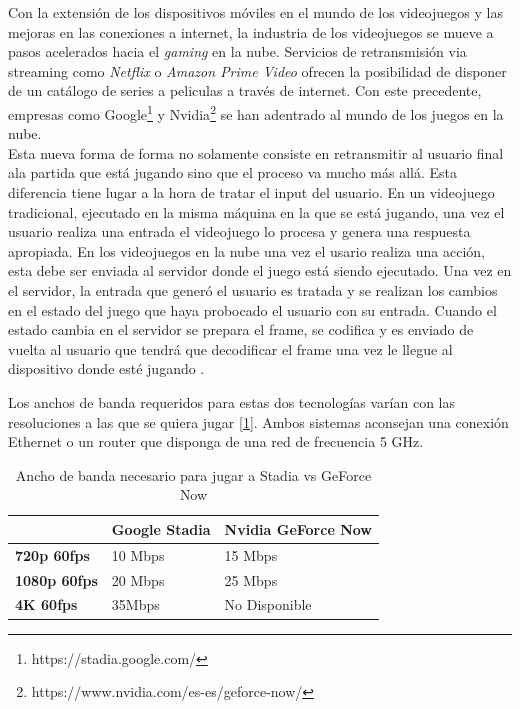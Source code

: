 Con la extensi\'on de los dispositivos m\'oviles en el mundo de los videojuegos y las mejoras en las conexiones a internet, la industria de los videojuegos se mueve a pasos acelerados hacia el \textit{gaming} en la nube. Servicios de retransmisi\'on via streaming como \textit{Netflix} o \textit{Amazon Prime Video} ofrecen la posibilidad de disponer de un cat\'alogo de series a peliculas a trav\'es de internet. Con este precedente, empresas como Google\footnote{https://stadia.google.com/} y Nvidia\footnote{https://www.nvidia.com/es-es/geforce-now/} se han adentrado al mundo de los juegos en la nube.\\

Esta nueva forma de forma no solamente consiste en retransmitir al usuario final ala partida que est\'a jugando sino que el proceso va mucho m\'as all\'a. Esta diferencia tiene lugar a la hora de tratar el input del usuario. En un videojuego tradicional, ejecutado en la misma m\'aquina en la que se est\'a jugando, una vez el usuario realiza una entrada el videojuego lo procesa y genera una respuesta apropiada. En los videojuegos en la nube una vez el usario realiza una acci\'on, esta debe ser enviada al servidor donde el juego est\'a siendo ejecutado. Una vez en el servidor, la entrada que gener\'o el usuario es tratada y se realizan los cambios en el estado del juego que haya probocado el usuario con su entrada. Cuando el estado cambia en el servidor se prepara el frame, se codifica y es enviado de vuelta al usuario que tendr\'a que decodificar el frame una vez le llegue al dispositivo donde est\'e jugando \citep{cloudgaming}.

Los anchos de banda requeridos para estas dos tecnolog\'ias var\'ian con las resoluciones a las que se quiera jugar [\ref{stadiovsgeforce}]. Ambos sistemas aconsejan una conexi\'on Ethernet o un router que disponga de una red de frecuencia 5 GHz.

\begin{table}[h]
    \begin{tabular}{lll}
        \toprule
         & \textbf{Google Stadia} & \textbf{Nvidia GeForce Now} \\
        \midrule
        \textbf{720p 60fps} & 10 Mbps & 15 Mbps\\
        \textbf{1080p 60fps} & 20 Mbps & 25 Mbps \\
		\textbf{4K 60fps} & 35Mbps & No Disponible \\
        \bottomrule
    \end{tabular}
\caption{Ancho de banda necesario para jugar a Stadia vs GeForce Now}
\label{stadiovsgeforce}
\end{table}




